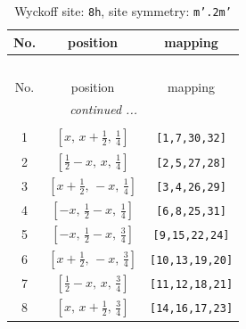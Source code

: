\documentclass[fleqn,8pt]{jsarticle}
\begin{document}
\begin{longtable}{ccc}
\caption{Wyckoff site: {\tt 8h}, site symmetry: {\tt m'.2m'}}
 \\
 \hline \hline
No. & position & mapping \\ \hline \endfirsthead

\multicolumn{2}{l}{\tablename\ \thetable{}} \\
 \hline \hline
No. & position & mapping \\ \hline \endhead

 \hline \hline
\multicolumn{2}{r}{\footnotesize\it continued ...} \\ \endfoot

 \hline \hline
\multicolumn{2}{r}{} \\ \endlastfoot

1 & $\left[ x,\, x + \frac{1}{2},\, \frac{1}{4} \right]$ & {\tt [1,7,30,32]} \\ \hline
2 & $\left[ \frac{1}{2} - x,\, x,\, \frac{1}{4} \right]$ & {\tt [2,5,27,28]} \\ \hline
3 & $\left[ x + \frac{1}{2},\, - x,\, \frac{1}{4} \right]$ & {\tt [3,4,26,29]} \\ \hline
4 & $\left[ - x,\, \frac{1}{2} - x,\, \frac{1}{4} \right]$ & {\tt [6,8,25,31]} \\ \hline
5 & $\left[ - x,\, \frac{1}{2} - x,\, \frac{3}{4} \right]$ & {\tt [9,15,22,24]} \\ \hline
6 & $\left[ x + \frac{1}{2},\, - x,\, \frac{3}{4} \right]$ & {\tt [10,13,19,20]} \\ \hline
7 & $\left[ \frac{1}{2} - x,\, x,\, \frac{3}{4} \right]$ & {\tt [11,12,18,21]} \\ \hline
8 & $\left[ x,\, x + \frac{1}{2},\, \frac{3}{4} \right]$ & {\tt [14,16,17,23]} \\
\end{longtable}
\renewcommand{\arraystretch}{1.2}
\end{document}

